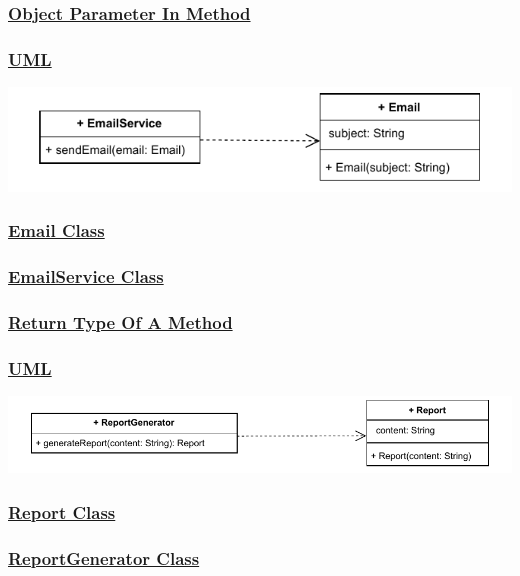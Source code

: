 \subsubsection*{\underline{Object Parameter In Method}}
\subsubsection*{\underline{UML}}
\includegraphics[width=\textwidth]{Chapters/Diagram/OOP/EX3/ex3.b.drawio.pdf}

\subsubsection*{\underline{Email Class}}


\subsubsection*{\underline{EmailService Class}}



\subsubsection*{\underline{Return Type Of A Method}}
\subsubsection*{\underline{UML}}
\includegraphics[width=\textwidth]{Chapters/Diagram/OOP/EX3/ex3.c.drawio.pdf}

\subsubsection*{\underline{Report Class}}


\subsubsection*{\underline{ReportGenerator Class}}


